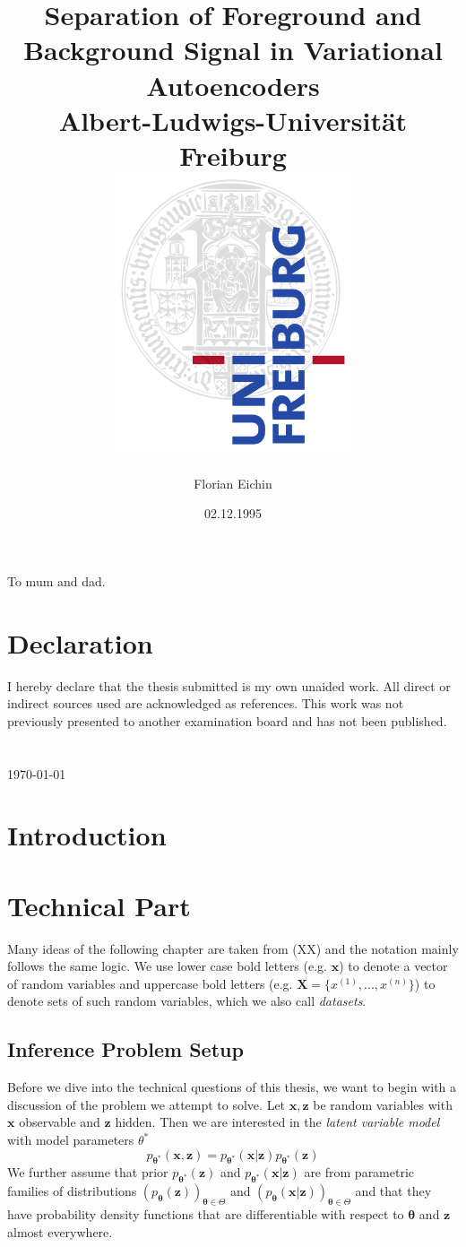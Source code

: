 \documentclass[12pt]{report}
\title{
{Separation of Foreground and Background Signal in Variational Autoencoders}\\
{\large Albert-Ludwigs-Universität Freiburg}\\[\baselineskip]
{\includegraphics[width=7cm]{logo.png}}
}
\author{Florian Eichin}
\date{02.12.1995}
\theoremstyle{definition}
\begin{document}
\maketitle

\chapter*{}
\begin{center}
To mum and dad.
\end{center}
 
\chapter*{Declaration}
I hereby declare that the thesis submitted is my own unaided work. All direct or indirect sources used are acknowledged as references. This work was not previously presented to another examination board and has not been published. \\ \\ \\

\today
 
\tableofcontents

\chapter{Introduction}

\chapter{Technical Part}

Many ideas of the following chapter are taken from (XX) and the notation mainly follows the same logic. We use lower case bold letters (e.g. $\mathbf{x}$) to denote a vector of random variables and uppercase bold letters (e.g. $\mathbf{X} = \{ x^(1), ..., x^(n)\}$) to denote sets of such random variables, which we also call \emph{datasets}.

\section{Inference Problem Setup}
Before we dive into the technical questions of this thesis, we want to begin with a discussion of the problem we attempt to solve. Let $\mathbf{x}, \mathbf{z}$ be random variables with $\mathbf{x}$ observable and $\mathbf{z}$ hidden. Then we are interested in the \textit{latent variable model} with model parameters $\theta^*$
\begin{equation}
	p_{\mathbf{\theta^*}}(\mathbf{x}, \mathbf{z}) = p_{\mathbf{\theta^*}}(\mathbf{x}| \mathbf{z})p_{\mathbf{\theta^*}}(\mathbf{z})
\end{equation}
We further assume that prior $p_{\mathbf{\theta^*}}(\mathbf{z})$ and $p_{\pmb{\theta^*}}(\mathbf{x}|\mathbf{z})$ are from parametric families of distributions $(p_{\pmb{\theta}}(\mathbf{z}))_{\pmb{\theta} \in \Theta}$ and $(p_{\pmb{\theta}}(\mathbf{x}|\mathbf{z}))_{\pmb{\theta} \in \Theta}$ and that they have probability density functions that are differentiable with respect to $\pmb{\theta}$ and $\mathbf{z}$ almost everywhere.
\end{document}
